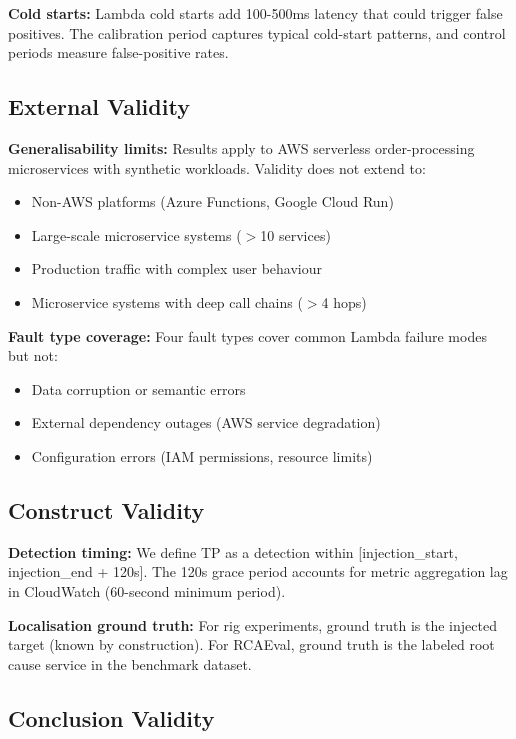 \textbf{Cold starts:} Lambda cold starts add 100-500ms latency that could trigger false positives. The calibration period captures typical cold-start patterns, and control periods measure false-positive rates.

\subsection{External Validity}

\textbf{Generalisability limits:} Results apply to AWS serverless order-processing microservices with synthetic workloads. Validity does not extend to:
\begin{itemize}
    \item Non-AWS platforms (Azure Functions, Google Cloud Run)
    \item Large-scale microservice systems ($>$10 services)
    \item Production traffic with complex user behaviour
    \item Microservice systems with deep call chains ($>$4 hops)
\end{itemize}

\textbf{Fault type coverage:} Four fault types cover common Lambda failure modes but not:
\begin{itemize}
    \item Data corruption or semantic errors
    \item External dependency outages (AWS service degradation)
    \item Configuration errors (IAM permissions, resource limits)
\end{itemize}

\subsection{Construct Validity}

\textbf{Detection timing:} We define TP as a detection within [injection\_start, injection\_end + 120s]. The 120s grace period accounts for metric aggregation lag in CloudWatch (60-second minimum period).

\textbf{Localisation ground truth:} For rig experiments, ground truth is the injected target (known by construction). For RCAEval, ground truth is the labeled root cause service in the benchmark dataset.

\subsection{Conclusion Validity}

